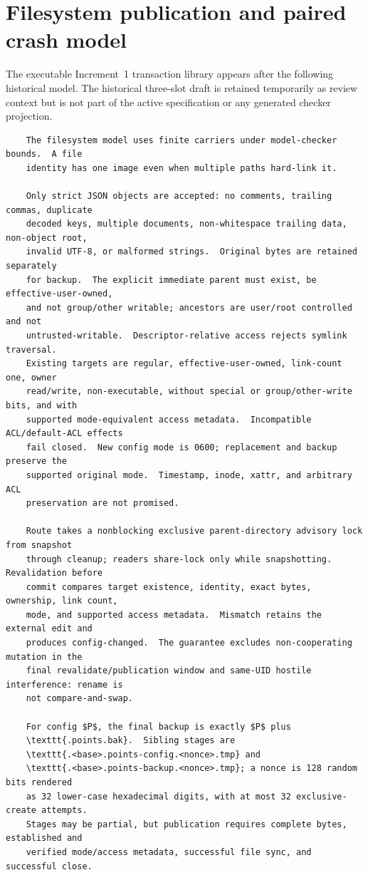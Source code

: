 \documentclass{article}
\begin{document}
\section{Filesystem publication and paired crash model}

The executable Increment~1 transaction library appears after the following
historical model.  The historical three-slot draft is retained temporarily as
review context but is not part of the active specification or any generated
checker projection.

\begin{verbatim}
	The filesystem model uses finite carriers under model-checker bounds.  A file
	identity has one image even when multiple paths hard-link it.

	Only strict JSON objects are accepted: no comments, trailing commas, duplicate
	decoded keys, multiple documents, non-whitespace trailing data, non-object root,
	invalid UTF-8, or malformed strings.  Original bytes are retained separately
	for backup.  The explicit immediate parent must exist, be effective-user-owned,
	and not group/other writable; ancestors are user/root controlled and not
	untrusted-writable.  Descriptor-relative access rejects symlink traversal.
	Existing targets are regular, effective-user-owned, link-count one, owner
	read/write, non-executable, without special or group/other-write bits, and with
	supported mode-equivalent access metadata.  Incompatible ACL/default-ACL effects
	fail closed.  New config mode is 0600; replacement and backup preserve the
	supported original mode.  Timestamp, inode, xattr, and arbitrary ACL
	preservation are not promised.

	Route takes a nonblocking exclusive parent-directory advisory lock from snapshot
	through cleanup; readers share-lock only while snapshotting.  Revalidation before
	commit compares target existence, identity, exact bytes, ownership, link count,
	mode, and supported access metadata.  Mismatch retains the external edit and
	produces config-changed.  The guarantee excludes non-cooperating mutation in the
	final revalidate/publication window and same-UID hostile interference: rename is
	not compare-and-swap.

	For config $P$, the final backup is exactly $P$ plus
	\texttt{.points.bak}.  Sibling stages are
	\texttt{.<base>.points-config.<nonce>.tmp} and
	\texttt{.<base>.points-backup.<nonce>.tmp}; a nonce is 128 random bits rendered
	as 32 lower-case hexadecimal digits, with at most 32 exclusive-create attempts.
	Stages may be partial, but publication requires complete bytes, established and
	verified mode/access metadata, successful file sync, and successful close.


\end{verbatim}
\end{document}
